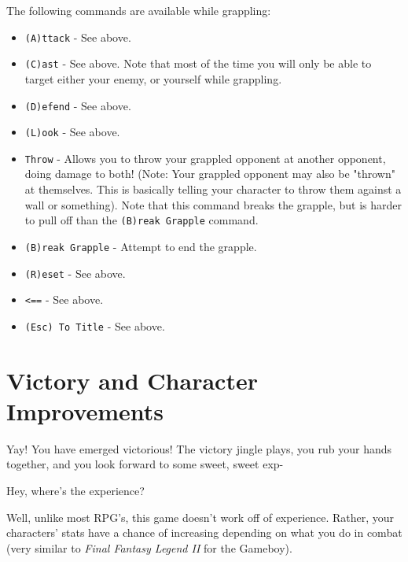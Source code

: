 \documentclass{report}
\begin{document}
The following commands are available while grappling:
\begin{itemize}
    \item \verb|(A)ttack| - See above.
    \item \verb|(C)ast| - See above. Note that most of the time you will only
    be able to target either your enemy, or yourself while grappling.
    \item \verb|(D)efend| - See above.
    \item \verb|(L)ook| - See above.
    \item \verb|Throw| - Allows you to throw your grappled opponent at another
    opponent, doing damage to both! (Note: Your grappled opponent may also be "thrown" at
    themselves. This is basically telling your character to throw them against
    a wall or something). Note that this command breaks the grapple, but is harder
    to pull off than the \verb|(B)reak Grapple| command.
    \item \verb|(B)reak Grapple| - Attempt to end the grapple.
    \item \verb|(R)eset| -  See above.
    \item {\color{green!50!black} \texttt{<==}} - See above.
    \item \verb|(Esc) To Title| - See above.
\end{itemize}

\section{Victory and Character Improvements}
Yay! You have emerged victorious! The victory jingle plays, you rub your hands
together, and you look forward to some sweet, sweet exp-

Hey, where's the experience?

Well, unlike most RPG's, this game doesn't work off of experience. Rather, your
characters' stats have a chance of increasing depending on what you do in 
combat (very similar to \textit{Final Fantasy Legend II} for the Gameboy).
\end{document}
